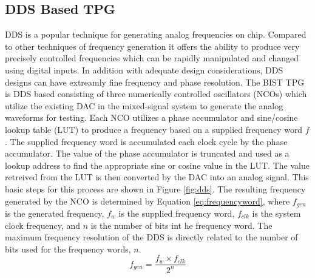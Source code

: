 \documentclass[12pt]{report}
\begin{document}
\subsection{DDS Based TPG}
DDS is a popular technique for generating analog frequencies on chip.  Compared to other techniques of frequency generation it offers the ability to produce very precisely controlled frequencies which can be rapidly manipulated and changed using digital inputs.  In addition with adequate design considerations, DDS designs can have extreamly fine frequency and phase resolution\cite{qi}.  The BIST TPG is DDS based consisting of three numerically controlled oscillators (NCOs) which utilize the existing DAC in the mixed-signal system to generate the analog waveforms for testing\cite{testtime}.  Each NCO utilizes a phase accumulator and sine/cosine lookup table (LUT) to produce a frequency based on a supplied frequency word $f$. The supplied frequency word is accumulated each clock cycle by the phase accumulator.  The value of the phase accumulator is truncated and used as a lookup address to find the appropriate sine or cosine value in the LUT.  The value retreived from the LUT is then converted by the DAC into an analog signal.  This basic steps for this process are shown in Figure \ref{fig:dds}.  The resulting frequency generated by the NCO is determined by Equation \ref{eq:frequencyword}, where $f_{gen}$ is the generated frequency, $f_w$ is the supplied frequency word, $f_{clk}$ is the system clock frequency, and $n$ is the number of bits int he frequency word.  The maximum frequency resolution of the DDS is directly related to the number of bits used for the frequency words, $n$.
\begin{equation}
	f_{gen} = \frac{f_w \times f_{clk}}{2^{n}}
	\label{eq:frequencyword}
\end{equation}
\end{document}
